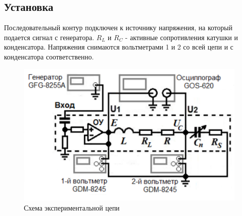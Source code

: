 \documentclass[a4paper, 12pt]{article}
\begin{document}
	\subsection*{Установка}
	Последовательный контур подключен к источнику напряжения, на который подается сигнал с генератора.
	$R_L$ и $R_C$ - активные сопротивления катушки и конденсатора. Напряжения снимаются вольтметрами 1 и 2 со всей цепи и с конденсатора соответственно.
	\begin{figure}[h!]
		\centering
		\includegraphics[width = \textwidth]{Цепь}
		\caption{Схема экспериментальной цепи}
	\end{figure}
\end{document}
